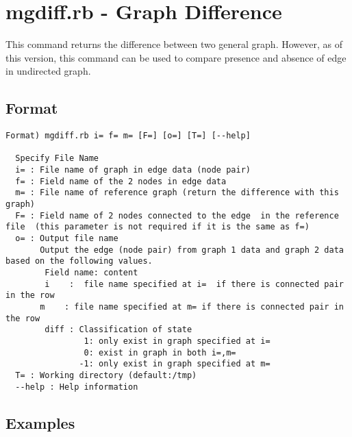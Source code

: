 
\section{mgdiff.rb - Graph Difference\label{sect:mgdiff}}

This command returns the difference between two general graph. 
However, as of this version, this command can be used to compare presence and absence of edge in undirected graph.  

\subsection{Format}
\begin{verbatim}
Format) mgdiff.rb i= f= m= [F=] [o=] [T=] [--help]

  Specify File Name 
  i= : File name of graph in edge data (node pair)
  f= : Field name of the 2 nodes in edge data
  m= : File name of reference graph (return the difference with this graph)
  F= : Field name of 2 nodes connected to the edge  in the reference file  (this parameter is not required if it is the same as f=)
  o= : Output file name
       Output the edge (node pair) from graph 1 data and graph 2 data based on the following values.  
        Field name: content
        i    :  file name specified at i=  if there is connected pair in the row 
       m    : file name specified at m= if there is connected pair in the row 
        diff : Classification of state
                1: only exist in graph specified at i=
                0: exist in graph in both i=,m=
               -1: only exist in graph specified at m=
  T= : Working directory (default:/tmp)
  --help : Help information
\end{verbatim}

\subsection{Examples}



